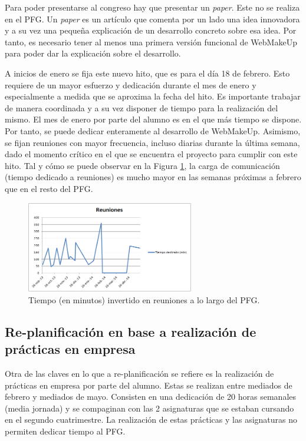 Para poder presentarse al congreso hay que presentar un \emph{paper}. Este no se realiza en el PFG. Un \emph{paper} es un artículo que comenta por un lado una idea innovadora y a su vez una pequeña explicación de un desarrollo concreto sobre esa idea. Por tanto, es necesario tener al menos una primera versión funcional de WebMakeUp para poder dar la explicación sobre el desarrollo.

A inicios de enero se fija este nuevo hito, que es para el día 18 de febrero. Esto requiere de un mayor esfuerzo y dedicación durante el mes de enero y especialmente a medida que se aproxima la fecha del hito. Es importante trabajar de manera coordinada y a su vez disponer de tiempo para la realización del mismo. El mes de enero por parte del alumno es en el que más tiempo se dispone. Por tanto, se puede dedicar enteramente al desarrollo de WebMakeUp. Asimismo, se fijan reuniones con mayor frecuencia, incluso diarias durante la última semana, dado el momento crítico en el que se encuentra el proyecto para cumplir con este hito. Tal y cómo se puede observar en la Figura \ref{fig:graficoReuniones}, la carga de comunicación (tiempo dedicado a reuniones) es mucho mayor en las semanas próximas a febrero que en el resto del PFG.

\begin{figure}
\begin{center}
\includegraphics[width=0.65\textwidth]{figs/6-GraficoReuniones.png}
\end{center}
\caption{Tiempo (en minutos) invertido en reuniones a lo largo del PFG.}
\label{fig:graficoReuniones}
\end{figure}

\subsection{Re-planificación en base a realización de prácticas en empresa}

Otra de las claves en lo que a re-planificación se refiere es la realización de prácticas en empresa por parte del alumno. Estas se realizan entre mediados de febrero y mediados de mayo. Consisten en una dedicación de 20 horas semanales (media jornada) y se compaginan con las 2 asignaturas que se estaban cursando en el segundo cuatrimestre. La realización de estas prácticas y las asignaturas no permiten dedicar tiempo al PFG.

